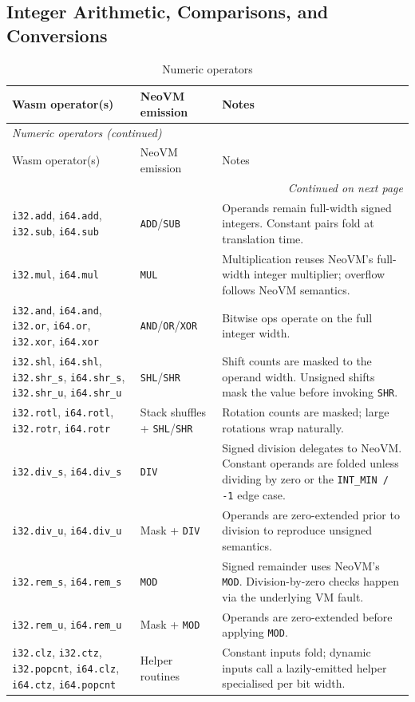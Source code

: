 \documentclass[11pt]{article}
\begin{document}
\subsection{Integer Arithmetic, Comparisons, and Conversions}
\begin{longtable}{@{}p{4.7cm}p{3.8cm}p{6.5cm}@{}}
\caption{Numeric operators}\\
\toprule
Wasm operator(s) & NeoVM emission & Notes \\
\midrule
\endfirsthead
\multicolumn{3}{l}{\textit{Numeric operators (continued)}}\\
\toprule
Wasm operator(s) & NeoVM emission & Notes \\
\midrule
\endhead
\midrule
\multicolumn{3}{r}{\textit{Continued on next page}}\\
\bottomrule
\endfoot
\bottomrule
\endlastfoot
\texttt{i32.add}, \texttt{i64.add}, \texttt{i32.sub}, \texttt{i64.sub} & \texttt{ADD}/\texttt{SUB} & Operands remain full-width signed integers. Constant pairs fold at translation time.
\tabularnewline
\texttt{i32.mul}, \texttt{i64.mul} & \texttt{MUL} & Multiplication reuses NeoVM's full-width integer multiplier; overflow follows NeoVM semantics.
\tabularnewline
\texttt{i32.and}, \texttt{i64.and}, \texttt{i32.or}, \texttt{i64.or}, \texttt{i32.xor}, \texttt{i64.xor} & \texttt{AND}/\texttt{OR}/\texttt{XOR} & Bitwise ops operate on the full integer width.
\tabularnewline
\texttt{i32.shl}, \texttt{i64.shl}, \texttt{i32.shr\_s}, \texttt{i64.shr\_s}, \texttt{i32.shr\_u}, \texttt{i64.shr\_u} & \texttt{SHL}/\texttt{SHR} & Shift counts are masked to the operand width. Unsigned shifts mask the value before invoking \texttt{SHR}.
\tabularnewline
\texttt{i32.rotl}, \texttt{i64.rotl}, \texttt{i32.rotr}, \texttt{i64.rotr} & Stack shuffles + \texttt{SHL}/\texttt{SHR} & Rotation counts are masked; large rotations wrap naturally.
\tabularnewline
\texttt{i32.div\_s}, \texttt{i64.div\_s} & \texttt{DIV} & Signed division delegates to NeoVM. Constant operands are folded unless dividing by zero or the \texttt{INT\_MIN / -1} edge case.
\tabularnewline
\texttt{i32.div\_u}, \texttt{i64.div\_u} & Mask + \texttt{DIV} & Operands are zero-extended prior to division to reproduce unsigned semantics.
\tabularnewline
\texttt{i32.rem\_s}, \texttt{i64.rem\_s} & \texttt{MOD} & Signed remainder uses NeoVM's \texttt{MOD}. Division-by-zero checks happen via the underlying VM fault.
\tabularnewline
\texttt{i32.rem\_u}, \texttt{i64.rem\_u} & Mask + \texttt{MOD} & Operands are zero-extended before applying \texttt{MOD}.
\tabularnewline
\texttt{i32.clz}, \texttt{i32.ctz}, \texttt{i32.popcnt}, \texttt{i64.clz}, \texttt{i64.ctz}, \texttt{i64.popcnt} & Helper routines & Constant inputs fold; dynamic inputs call a lazily-emitted helper specialised per bit width.

\end{longtable}
\end{document}
